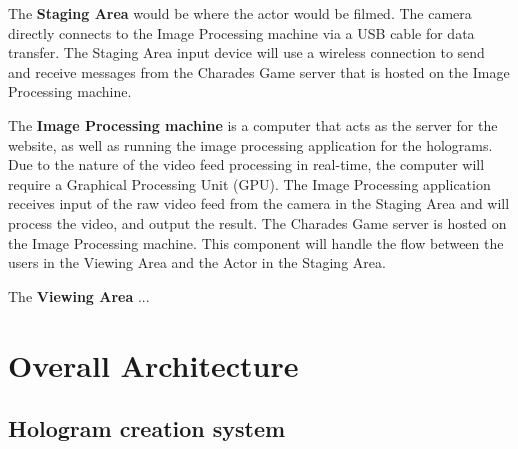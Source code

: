 The \textbf{Staging Area} would be where the actor would be filmed. The camera directly connects to the Image Processing machine via a USB cable for data transfer. The Staging Area input device will use a wireless connection to send and receive messages from the Charades Game server that is hosted on the Image Processing machine.

The \textbf{Image Processing machine} is a computer that acts as the server for the website, as well as running the image processing application for the holograms. Due to the nature of the video feed processing in real-time, the computer will require a Graphical Processing Unit (GPU). The Image Processing application receives input of the raw video feed from the camera in the Staging Area and will process the video, and output the result. The Charades Game server is hosted on the Image Processing machine. This component will handle the flow between the users in the Viewing Area and the Actor in the Staging Area.

The \textbf{Viewing Area} ...


\newpage


\section{Overall Architecture}
\subsection{Hologram creation system}

\begin{figure}[h!]
\end{figure}

